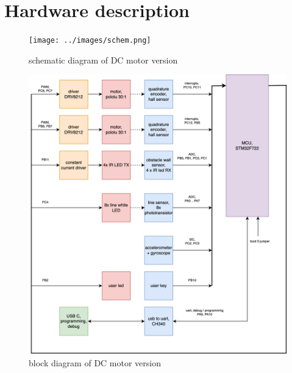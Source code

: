 \documentclass[12pt,twoside,onecolumn,openany,extrafontsizes,dvipsnames]{memoir}
\title{\booktitle}
\author{\authorname}
\begin{document}
\chapter{Hardware description}

\newpage

\begin{figure}[h]
    
    \texttt{[image: ../images/schem.png]}
    \caption{schematic diagram of DC motor version}
\end{figure}


\newpage

\begin{figure}[h]
    \includegraphics[scale=0.8]{../diagrams/diagrams.png}
    \caption{block diagram of DC motor version}
\end{figure}


\newpage
\end{document}
